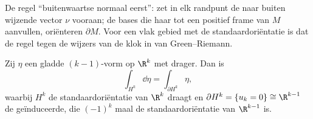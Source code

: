 \begin{omfigure}

{\small De regel ``buitenwaartse normaal eerst'': zet in elk
randpunt de naar buiten wijzende vector $\nu$ vooraan; de bases
die haar tot een positief frame van $M$ aanvullen, oriënteren
$\partial M$. Voor een vlak gebied met de standaardoriëntatie is
dat de regel tegen de wijzers van de klok in van
Green--Riemann.}
\end{omfigure}

\begin{lemma}
\label{lem:b3:forms:halfspace}
Zij $\eta$ een gladde $(k-1)$-vorm op $\R^k$ met  drager.
Dan is
\[
\int_{H^k}\dd\eta = \int_{\partial H^k}\eta,
\]
waarbij $H^k$ de standaardoriëntatie van $\R^k$ draagt en
$\partial H^k = \{u_k = 0\} \cong \R^{k-1}$ de geïnduceerde, die
$(-1)^k$ maal de standaardoriëntatie van $\R^{k-1}$ is.
\end{lemma}

